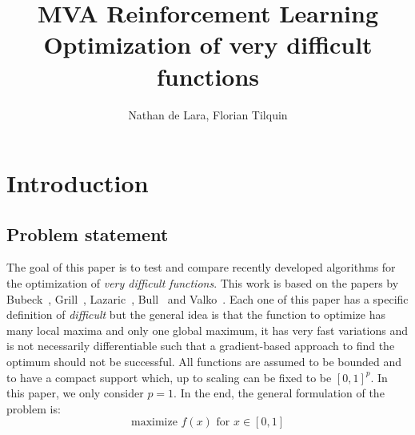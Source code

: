 \documentclass[a4paper,10pt]{article}
\begin{document}
\title{MVA Reinforcement Learning\\
Optimization of very difficult functions}

\author{Nathan de Lara, Florian Tilquin}
\maketitle

\section{Introduction}
\subsection{Problem statement}
The goal of this paper is to test and compare recently developed algorithms for the optimization of \textit{very difficult functions}. This work is based on the papers by Bubeck~\cite{bubeck2011x}, Grill~\cite{grill2015black}, Lazaric~\cite{azar2014online}, Bull~\cite{bull2013adaptive} and Valko~\cite{valko2013stochastic}. Each one of this paper has a specific definition of \textit{difficult} but the general idea is that the function to optimize has many local maxima and only one global maximum, it has very fast variations and is not necessarily differentiable such that a gradient-based approach to find the optimum should not be successful. All functions are assumed to be bounded and to have a compact support which, up to scaling can be fixed to be $[0,1]^p$. In this paper, we only consider $p=1$. In the end, the general formulation of the problem is:
\begin{equation}
\mbox{maximize } f(x) \mbox{ for } x\in [0,1]
\end{equation}
\end{document}
